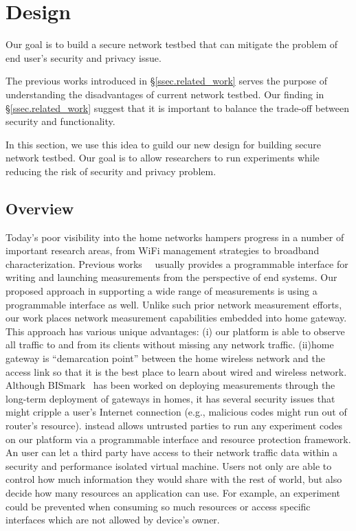 \chapter{\sysname Design}
\label{sec.design}
Our goal is to build a secure network testbed that can mitigate the problem 
of end user's security and privacy issue. 

The previous works introduced in \S{\ref{ssec.related_work}} serves the 
purpose of understanding the disadvantages of current network testbed. Our 
finding in \S{\ref{ssec.related_work}} suggest that it is important to 
balance the trade-off between security and functionality.

In this section, we use this idea to guild our new design for building 
secure network testbed. Our goal is to allow researchers to run experiments 
while reducing the risk of security and privacy problem.

\section{Overview}
Today's poor visibility into the home networks hampers progress in a number of important research areas, from WiFi management strategies to broadband characterization. Previous works~\cite{sanchez2014measurement}~\cite{dhawan2012fathom} usually provides a programmable interface for writing and launching measurements from the perspective of end systems. Our proposed approach in supporting a wide range of measurements is using a programmable interface as well. Unlike such prior network measurement efforts, our work places network measurement capabilities embedded into home gateway. This approach has various unique advantages: (i) our platform is able to observe all traffic to and from its clients without missing any network traffic. (ii)home gateway is “demarcation point” between the home wireless network and the access link so that it is the best place to learn about wired and wireless network. Although BISmark~\cite{183951} has been worked on deploying measurements through the long-term deployment of gateways in homes, it has several security issues that might cripple a user's Internet connection (e.g., malicious codes might run out of router's resource). \sysname instead allows untrusted parties to run any experiment codes on our platform via a programmable interface and resource protection framework. An user can let a third party have access to their network traffic data within a security and performance isolated virtual machine. Users not only are able to control how much information they would share with the rest of world, but also decide how many resources an application can use. For example, an experiment could be prevented when consuming so much resources or access specific interfaces which are not allowed by device's owner. 

